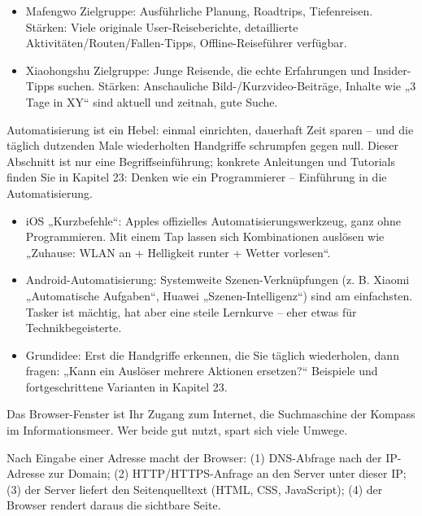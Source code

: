 
\begin{itemize}
  \item Mafengwo Zielgruppe: Ausführliche Planung, Roadtrips, Tiefenreisen. Stärken: Viele originale User-Reiseberichte, detaillierte Aktivitäten/Routen/Fallen-Tipps, Offline-Reiseführer verfügbar.
  \item Xiaohongshu Zielgruppe: Junge Reisende, die echte Erfahrungen und Insider-Tipps suchen. Stärken: Anschauliche Bild-/Kurzvideo-Beiträge, Inhalte wie „3 Tage in XY“ sind aktuell und zeitnah, gute Suche.
\end{itemize}


Automatisierung ist ein Hebel: einmal einrichten, dauerhaft Zeit sparen – und die täglich dutzenden Male wiederholten Handgriffe schrumpfen gegen null. Dieser Abschnitt ist nur eine Begriffseinführung; konkrete Anleitungen und Tutorials finden Sie in Kapitel 23: Denken wie ein Programmierer – Einführung in die Automatisierung.

\begin{itemize}
  \item iOS „Kurzbefehle“: Apples offizielles Automatisierungswerkzeug, ganz ohne Programmieren. Mit einem Tap lassen sich Kombinationen auslösen wie „Zuhause: WLAN an + Helligkeit runter + Wetter vorlesen“.
  \item Android-Automatisierung: Systemweite Szenen-Verknüpfungen (z. B. Xiaomi „Automatische Aufgaben“, Huawei „Szenen-Intelligenz“) sind am einfachsten. Tasker ist mächtig, hat aber eine steile Lernkurve – eher etwas für Technikbegeisterte.
  \item Grundidee: Erst die Handgriffe erkennen, die Sie täglich wiederholen, dann fragen: „Kann ein Auslöser mehrere Aktionen ersetzen?“ Beispiele und fortgeschrittene Varianten in Kapitel 23.
\end{itemize}


Das Browser-Fenster ist Ihr Zugang zum Internet, die Suchmaschine der Kompass im Informationsmeer. Wer beide gut nutzt, spart sich viele Umwege.


Nach Eingabe einer Adresse macht der Browser: (1) DNS-Abfrage nach der IP-Adresse zur Domain; (2) HTTP/HTTPS-Anfrage an den Server unter dieser IP; (3) der Server liefert den Seitenquelltext (HTML, CSS, JavaScript); (4) der Browser rendert daraus die sichtbare Seite.

